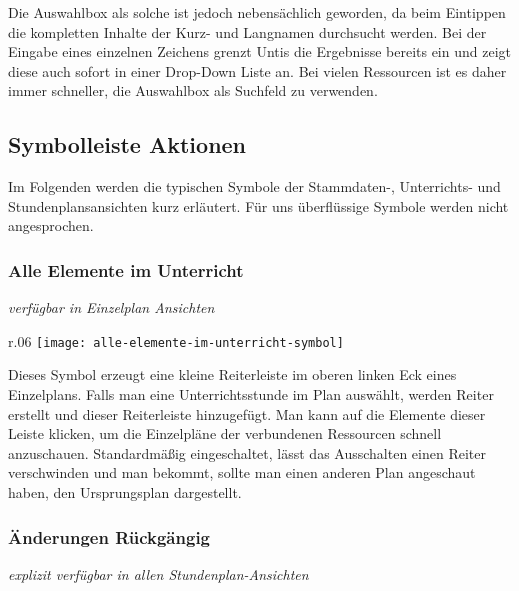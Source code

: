 \noindent
Die Auswahlbox als solche ist jedoch nebensächlich geworden, da beim Eintippen die kompletten Inhalte der Kurz- und Langnamen durchsucht werden. Bei der Eingabe eines einzelnen Zeichens grenzt Untis die Ergebnisse bereits ein und zeigt diese auch sofort in einer Drop-Down Liste an. Bei vielen Ressourcen ist es daher immer schneller,  die Auswahlbox als Suchfeld zu verwenden. 

\subsection{Symbolleiste Aktionen}
\label{sec:symbolleiste-aktionen}

Im Folgenden werden die typischen Symbole der Stammdaten-, Unterrichts- und Stundenplansansichten kurz erläutert. Für uns überflüssige Symbole werden nicht angesprochen.\\

\subsubsection{Alle Elemente im Unterricht}
{\small\textit{verfügbar in Einzelplan Ansichten\\}\par}

\begin{wrapfigure}{r}{.06\textwidth}
	\vspace{-50pt}
	\texttt{[image: alle-elemente-im-unterricht-symbol]}
	\vspace{-35pt}
\end{wrapfigure}

\noindent
Dieses Symbol erzeugt eine kleine Reiterleiste im oberen linken Eck eines Einzelplans. Falls man eine Unterrichtsstunde im Plan auswählt, werden Reiter erstellt und dieser Reiterleiste hinzugefügt. Man kann auf die Elemente dieser Leiste klicken, um die Einzelpläne der verbundenen Ressourcen schnell anzuschauen. Standardmäßig eingeschaltet, lässt das Ausschalten einen Reiter verschwinden und man bekommt, sollte man einen anderen Plan angeschaut haben, den Ursprungsplan dargestellt.\\

\subsubsection{Änderungen Rückgängig}
{\small\textit{explizit verfügbar in allen Stundenplan-Ansichten\\}\par}

